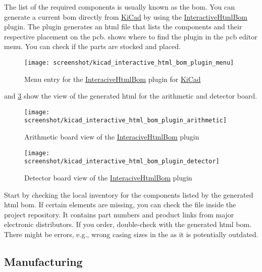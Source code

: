The list of the required components is usually known as the \gls{bom}.
You can generate a current \gls{bom} directly from \href{https://kicad-pcb.org}{KiCad} by using the \href{https://github.com/openscopeproject/InteractiveHtmlBom}{InteractiveHtmlBom} plugin.
The plugin generates an \gls{html} file that lists the components and their respective placement on the \gls{pcb}.
 shows where to find the plugin in the \gls{pcb} editor menu.
You can check if the parts are stocked and placed.
\begin{figure}[H]
	\centering
	\texttt{[image: screenshot/kicad\_interactive\_html\_bom\_plugin\_menu]}
	\caption{Menu entry for the \href{https://github.com/openscopeproject/InteractiveHtmlBom}{InteraciveHtmlBom} plugin for \href{https://kicad-pcb.org}{KiCad}}\label{fig:kicad_interactive_html_bom_plugin_menu}
\end{figure}
 and \cref{fig:kicad_interactive_html_bom_plugin_detector} show the view of the generated \gls{html} for the arithmetic and detector board.
\begin{figure}[H]
	\centering
	\texttt{[image: screenshot/kicad\_interactive\_html\_bom\_plugin\_arithmetic]}
	\caption{Arithmetic board view of the \href{https://github.com/openscopeproject/InteractiveHtmlBom}{InteraciveHtmlBom} plugin}\label{fig:kicad_interactive_html_bom_plugin_arithmetic}
\end{figure}
\begin{figure}[H]
	\centering
	\texttt{[image: screenshot/kicad\_interactive\_html\_bom\_plugin\_detector]}
	\caption{Detector board view of the \href{https://github.com/openscopeproject/InteractiveHtmlBom}{InteraciveHtmlBom} plugin}\label{fig:kicad_interactive_html_bom_plugin_detector}
\end{figure}
Start by checking the local inventory for the components listed by the generated \gls{html} \gls{bom}.
If certain elements are missing, you can check the  file inside the project repository.
It contains part numbers and product links from major electronic distributors.
If you order, double-check with the generated \gls{html} \gls{bom}.
There might be errors, e.g., wrong casing sizes in the  as it is potentially outdated.

\subsection{Manufacturing}


